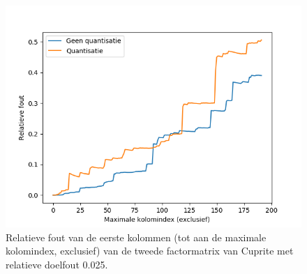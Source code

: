 \begin{figure}[]
  \centering
  \includegraphics[scale=0.7]{images/orthogonality_compression_basic_matrix.png}
  \caption{Relatieve fout van de eerste kolommen (tot aan de maximale kolomindex, exclusief) van de tweede factormatrix van Cuprite met relatieve doelfout 0.025.}
\label{fig:orthogonality-compression-basic-matrix}
\end{figure}

